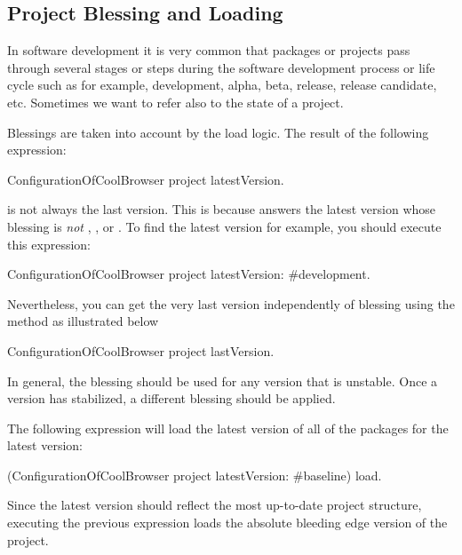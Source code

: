 \documentclass[a4paper,10pt,twoside]{book}
\begin{document}
    
\subsection{Project Blessing and Loading}

In software development it is very common that packages or projects pass through several stages or steps during the software development process or life cycle such as for example, development, alpha, beta,  release, release candidate, etc. Sometimes we want to refer also to the state of a project.

Blessings are taken into account by the load logic. The result of the following expression:
\begin{code}{}
ConfigurationOfCoolBrowser project latestVersion.
\end{code}
is not always the last version.  This is because  answers the latest version whose blessing is {\em not} , , or . To find the latest  version for example, you should execute this expression:

\begin{code}{}
ConfigurationOfCoolBrowser project latestVersion: #development.
\end{code}

Nevertheless, you can get the very last version independently of blessing using the  method as illustrated below

\begin{code}{}
ConfigurationOfCoolBrowser project lastVersion.
\end{code}

In general, the  blessing should be used for any version that is unstable. Once a version has stabilized, a different blessing should be applied.

The following expression will load the latest version of all of the packages for the latest  version:
 \begin{code}{}
(ConfigurationOfCoolBrowser project latestVersion: #baseline) load.
\end{code}

Since the latest  version should reflect the most up-to-date project structure, executing the previous expression loads the absolute bleeding edge version of the project. 
\end{document}

